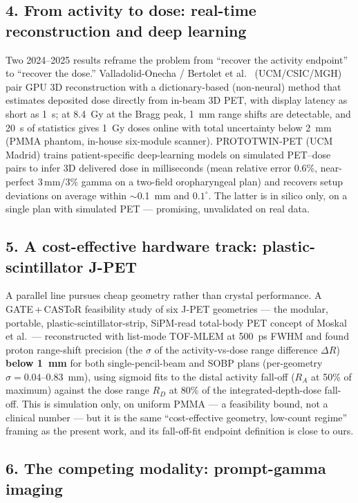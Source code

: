 \documentclass[11pt]{article}
\begin{document}
\subsection*{4. From activity to dose: real-time reconstruction and deep learning}

Two 2024--2025 results reframe the problem from ``recover the activity endpoint''
to ``recover the dose.'' Valladolid-Onecha / Bertolet et al.~\cite{valladolid2025}
(UCM/CSIC/MGH) pair GPU 3D reconstruction with a dictionary-based (non-neural)
method that estimates deposited dose directly from in-beam 3D PET, with display
latency as short as 1~s; at 8.4~Gy at the Bragg peak, 1~mm range shifts are
detectable, and 20~s of statistics gives 1~Gy doses online with total uncertainty
below 2~mm (PMMA phantom, in-house six-module scanner). PROTOTWIN-PET
\cite{prototwin2024} (UCM Madrid) trains patient-specific deep-learning models on
simulated PET--dose pairs to infer 3D delivered dose in milliseconds (mean
relative error 0.6\%, near-perfect $3\,\mathrm{mm}/3\%$ gamma on a two-field
oropharyngeal plan) and recovers setup deviations on average within $\sim$0.1~mm
and $0.1^{\circ}$. The latter is in silico only, on a single plan with simulated
PET --- promising, unvalidated on real data.

\subsection*{5. A cost-effective hardware track: plastic-scintillator J-PET}

A parallel line pursues cheap geometry rather than crystal performance. A
GATE\,+\,CASToR feasibility study of six J-PET geometries \cite{baran2023} --- the
modular, portable, plastic-scintillator-strip, SiPM-read total-body PET concept of
Moskal et al.\ --- reconstructed with list-mode TOF-MLEM at 500~ps FWHM and found
proton range-shift precision (the $\sigma$ of the activity-vs-dose range
difference $\Delta R$) \textbf{below 1~mm} for both single-pencil-beam and SOBP
plans (per-geometry $\sigma = 0.04$--$0.83$~mm), using sigmoid fits to the distal
activity fall-off ($R_A$ at 50\% of maximum) against the dose range $R_D$ at 80\%
of the integrated-depth-dose fall-off. This is simulation only, on uniform PMMA
--- a feasibility bound, not a clinical number --- but it is the same
``cost-effective geometry, low-count regime'' framing as the present work, and its
fall-off-fit endpoint definition is close to ours.

\subsection*{6. The competing modality: prompt-gamma imaging}
\end{document}

